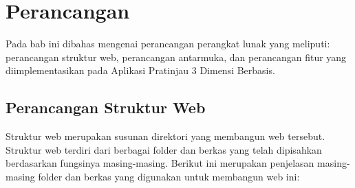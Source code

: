 \chapter{Perancangan}
\label{chapter:perancangan}
Pada bab ini dibahas mengenai perancangan perangkat lunak yang meliputi: perancangan struktur web, perancangan antarmuka, dan perancangan fitur yang diimplementasikan pada Aplikasi Pratinjau 3 Dimensi Berbasis.

\section{Perancangan Struktur Web}
\label{sec:analisisStrukturWeb}

Struktur web merupakan susunan direktori yang membangun web tersebut. Struktur web terdiri dari berbagai folder dan berkas yang telah dipisahkan berdasarkan fungsinya masing-masing. Berikut ini merupakan penjelasan masing-masing folder dan berkas yang digunakan untuk membangun web ini:


